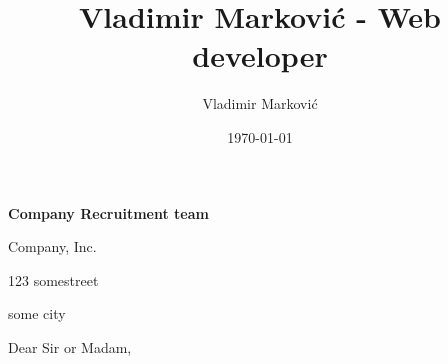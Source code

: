 \documentclass{article}
\title{Vladimir Marković - Web developer}
\author{Vladimir Marković}
\date{\today}
\begin{document}
\sffamily

\vspace{0mm}
\setlength{\parindent}{1mm}
\large
\textbf{Company Recruitment team}

\vspace{0mm}
\setlength{\parindent}{1mm}
Company, Inc.

\vspace{0mm}
\setlength{\parindent}{1mm}
123 somestreet

\vspace{0mm}
\setlength{\parindent}{1mm}
some city

\vspace{5mm}
\setlength{\parindent}{1mm}
\usdate{\today}

\vspace{5mm}
\setlength{\parindent}{1mm}
Dear Sir or Madam,

\vspace{5mm}
\end{document}

